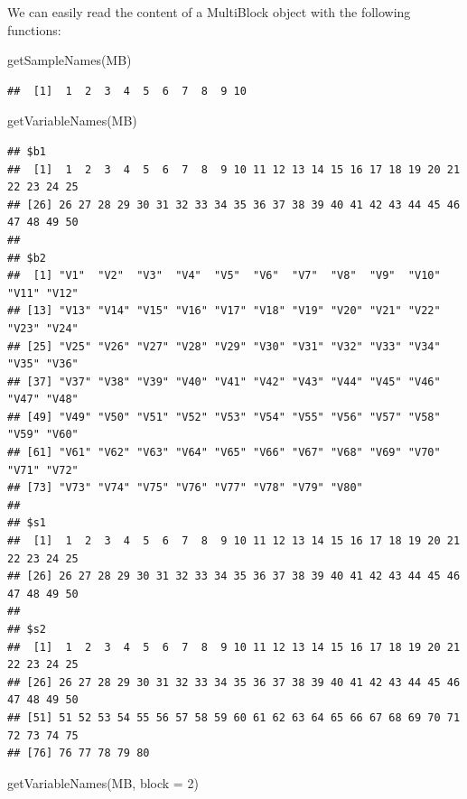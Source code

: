 \documentclass[
]{book}
\newenvironment{Shaded}{\begin{snugshade}}{\end{snugshade}}
\newcommand{\AttributeTok}[1]{\textcolor[rgb]{0.77,0.63,0.00}{#1}}
\newcommand{\DecValTok}[1]{\textcolor[rgb]{0.00,0.00,0.81}{#1}}
\newcommand{\FunctionTok}[1]{\textcolor[rgb]{0.00,0.00,0.00}{#1}}
\newcommand{\NormalTok}[1]{#1}
\begin{document}
We can easily read the content of a MultiBlock object with the following
functions:

\begin{Shaded}
\begin{Highlighting}[]
\FunctionTok{getSampleNames}\NormalTok{(MB)}
\end{Highlighting}
\end{Shaded}

\begin{verbatim}
##  [1]  1  2  3  4  5  6  7  8  9 10
\end{verbatim}

\begin{Shaded}
\begin{Highlighting}[]
\FunctionTok{getVariableNames}\NormalTok{(MB)}
\end{Highlighting}
\end{Shaded}

\begin{verbatim}
## $b1
##  [1]  1  2  3  4  5  6  7  8  9 10 11 12 13 14 15 16 17 18 19 20 21 22 23 24 25
## [26] 26 27 28 29 30 31 32 33 34 35 36 37 38 39 40 41 42 43 44 45 46 47 48 49 50
## 
## $b2
##  [1] "V1"  "V2"  "V3"  "V4"  "V5"  "V6"  "V7"  "V8"  "V9"  "V10" "V11" "V12"
## [13] "V13" "V14" "V15" "V16" "V17" "V18" "V19" "V20" "V21" "V22" "V23" "V24"
## [25] "V25" "V26" "V27" "V28" "V29" "V30" "V31" "V32" "V33" "V34" "V35" "V36"
## [37] "V37" "V38" "V39" "V40" "V41" "V42" "V43" "V44" "V45" "V46" "V47" "V48"
## [49] "V49" "V50" "V51" "V52" "V53" "V54" "V55" "V56" "V57" "V58" "V59" "V60"
## [61] "V61" "V62" "V63" "V64" "V65" "V66" "V67" "V68" "V69" "V70" "V71" "V72"
## [73] "V73" "V74" "V75" "V76" "V77" "V78" "V79" "V80"
## 
## $s1
##  [1]  1  2  3  4  5  6  7  8  9 10 11 12 13 14 15 16 17 18 19 20 21 22 23 24 25
## [26] 26 27 28 29 30 31 32 33 34 35 36 37 38 39 40 41 42 43 44 45 46 47 48 49 50
## 
## $s2
##  [1]  1  2  3  4  5  6  7  8  9 10 11 12 13 14 15 16 17 18 19 20 21 22 23 24 25
## [26] 26 27 28 29 30 31 32 33 34 35 36 37 38 39 40 41 42 43 44 45 46 47 48 49 50
## [51] 51 52 53 54 55 56 57 58 59 60 61 62 63 64 65 66 67 68 69 70 71 72 73 74 75
## [76] 76 77 78 79 80
\end{verbatim}

\begin{Shaded}
\begin{Highlighting}[]
\FunctionTok{getVariableNames}\NormalTok{(MB, }\AttributeTok{block =} \DecValTok{2}\NormalTok{)}
\end{Highlighting}
\end{Shaded}
\end{document}
